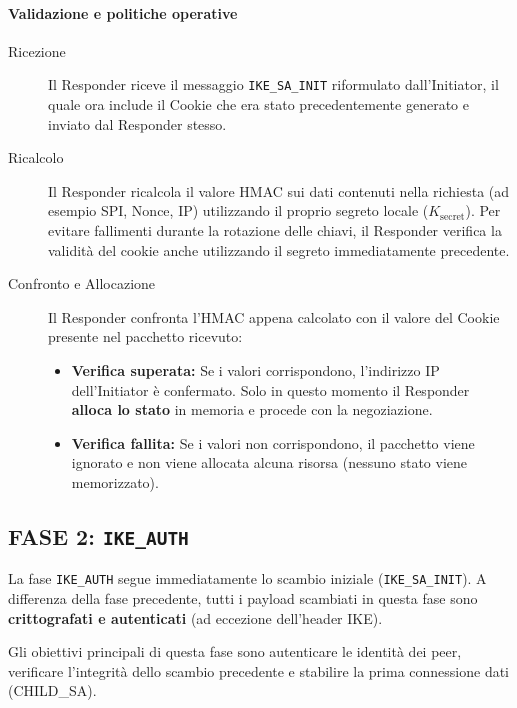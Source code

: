 \documentclass[a4paper, 11pt]{article}
\begin{document}
\paragraph{Validazione e politiche operative}
\begin{description}
    \item[Ricezione] 
    Il Responder riceve il messaggio \texttt{IKE\_SA\_INIT} riformulato dall'Initiator, il quale ora include il Cookie che era stato precedentemente generato e inviato dal Responder stesso.

    \item[Ricalcolo] 
    Il Responder ricalcola il valore HMAC sui dati contenuti nella richiesta (ad esempio SPI, Nonce, IP) utilizzando il proprio segreto locale ($K_{\text{secret}}$). Per evitare fallimenti durante la rotazione delle chiavi, il Responder verifica la validità del cookie anche utilizzando il segreto immediatamente precedente.

    \item[Confronto e Allocazione] 
    Il Responder confronta l'HMAC appena calcolato con il valore del Cookie presente nel pacchetto ricevuto:
    \begin{itemize}
        \item \textbf{Verifica superata:} Se i valori corrispondono, l'indirizzo IP dell'Initiator è confermato. Solo in questo momento il Responder \textbf{alloca lo stato} in memoria e procede con la negoziazione.
        \item \textbf{Verifica fallita:} Se i valori non corrispondono, il pacchetto viene ignorato e non viene allocata alcuna risorsa (nessuno stato viene memorizzato).
    \end{itemize}
\end{description}

\subsection{FASE 2: \texttt{IKE\_AUTH}}

La fase \texttt{IKE\_AUTH} segue immediatamente lo scambio iniziale (\texttt{IKE\_SA\_INIT}). A differenza della fase precedente, tutti i payload scambiati in questa fase sono \textbf{crittografati e autenticati} (ad eccezione dell'header IKE).

Gli obiettivi principali di questa fase sono autenticare le identità dei peer, verificare l'integrità dello scambio precedente e stabilire la prima connessione dati (CHILD\_SA).
\end{document}
